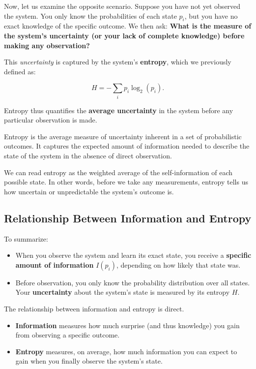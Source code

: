 \documentclass[12pt,a4paper]{article}
\newenvironment{defbox}[1][]{%
  \begin{tcolorbox}[enhanced, breakable, colback=defcolor, colframe=green!50!black, title=#1, fonttitle=\bfseries, arc=3pt, boxrule=0.5pt]
}{\end{tcolorbox}}
\newenvironment{rembox}[1][]{%
  \begin{tcolorbox}[enhanced, breakable, colback=gray!5, colframe=gray!50, title=#1, fonttitle=\bfseries, arc=3pt, boxrule=0.5pt]
}{\end{tcolorbox}}
\begin{document}
Now, let us examine the opposite scenario. Suppose you have not yet observed the system. You only know the probabilities of each state $p_i$, but you have no exact knowledge of the specific outcome. We then ask: \textbf{What is the measure of the system’s uncertainty (or your lack of complete knowledge) before making any observation?}

This \emph{uncertainty} is captured by the system’s \textbf{entropy}, which we previously defined as:

\begin{equation}
H = - \sum_i p_i \log_2(p_i).
\end{equation}

Entropy thus quantifies the \textbf{average uncertainty} in the system before any particular observation is made.

\begin{defbox}[Entropy and Uncertainty]
Entropy is the average measure of uncertainty inherent in a set of probabilistic outcomes. It captures the expected amount of information needed to describe the state of the system in the absence of direct observation.
\end{defbox}

We can read entropy as the weighted average of the self-information of each possible state. In other words, before we take any measurements, entropy tells us how uncertain or unpredictable the system’s outcome is.

\subsection{Relationship Between Information and Entropy}

To summarize:

\begin{itemize}
    \item When you observe the system and learn its exact state, you receive a \textbf{specific amount of information} $I(p_i)$, depending on how likely that state was.
    \item Before observation, you only know the probability distribution over all states. Your \textbf{uncertainty} about the system’s state is measured by its entropy $H$.
\end{itemize}

\begin{rembox}[Key Insight]
The relationship between information and entropy is direct. 
\begin{itemize}
    \item \textbf{Information} measures how much surprise (and thus knowledge) you gain from observing a specific outcome.
    \item \textbf{Entropy} measures, on average, how much information you can expect to gain when you finally observe the system’s state.
\end{itemize}
\end{rembox}
\end{document}
